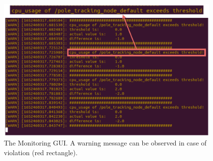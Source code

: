 \begin{itemize}
      \begin{figure}[hb!]
    \centering
    \includegraphics[width=0.9\columnwidth]{figures/result_gui.pdf}
    \caption{The Monitoring GUI. A warning message can be observed in case of violation (red rectangle). }
    \label{fig781}
    \end{figure}
    
    

\end{itemize}
